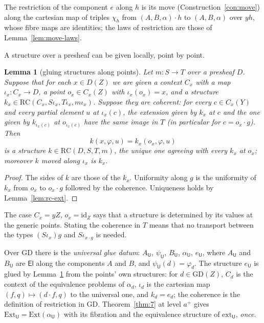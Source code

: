 \documentclass[11pt]{article}
\newcommand{\U}{\mathsf{U}}
\newcommand{\El}{\mathsf{El}}
\newcommand{\Ext}{\mathrm{Ext}}
\newcommand{\ext}{\mathrm{ext}}
\newcommand{\RC}{\mathrm{RC}}
\newcommand{\GD}{\mathrm{GD}}
\theoremstyle{plain}
\newtheorem{lemma}[theorem]{Lemma}
\theoremstyle{definition}
\theoremstyle{remark}
\begin{document}
The restriction of the component $e$ along $h$ is its move
(Construction~\ref{con:move}) along the cartesian map of triples
$\chi_h$ from $(A,B,\alpha)\cdot h$ to $(A,B,\alpha)$ over $yh$, whose
fibre maps are identities; the laws of restriction are those of
Lemma~\ref{lem:move-laws}.

A structure over a presheaf can be given locally, point by point.

\begin{lemma}[gluing structures along points]\label{lem:glue-rc}
Let $m:S\to T$ over a presheaf $D$. Suppose that for each $x\in D(Z)$
we are given a context $C_x$ with a map $\iota_x:C_x\to D$, a point
$o_x\in C_x(Z)$ with $\iota_x(o_x)=x$, and a structure
$k_x\in\RC(C_x,S\iota_x,T\iota_x,m\iota_x)$. Suppose they are
coherent: for every $c\in C_x(Y)$ and every partial element $u$ at
$\iota_x(c)$, the extension given by $k_x$ at $c$ and the one given by
$k_{\iota_x(c)}$ at $o_{\iota_x(c)}$ have the same image in $T$ (in
particular for $c=o_x\cdot g$). Then
\[
k(x,\varphi,u)=k_x(o_x,\varphi,u)
\]
is a structure $k\in\RC(D,S,T,m)$, the unique one agreeing with every
$k_x$ at $o_x$; moreover $k$ moved along $\iota_x$ is $k_x$.
\end{lemma}

\begin{proof}
The sides of $k$ are those of the $k_x$. Uniformity along $g$ is the
uniformity of $k_x$ from $o_x$ to $o_x\cdot g$ followed by the coherence.
Uniqueness holds by Lemma~\ref{lem:rc-ext}.
\end{proof}

The case $C_x=yZ$, $o_x=\mathrm{id}_Z$ says that a structure is
determined by its values at the generic points. Stating the coherence in
$T$ means that no transport between the types $(S\iota_x)g$ and
$S\iota_{x\cdot g}$ is needed.

Over $\GD$ there is the \emph{universal glue datum}: $A_\U$, $\psi_\U$,
$B_\U$, $\alpha_\U$, $e_\U$, where $A_\U$ and $B_\U$ are $\El$ along the
components $A$ and $B$, and $\psi_\U(d)=\varphi_d$. The structure $e_\U$
is glued by Lemma~\ref{lem:glue-rc} from the points' own structures:
for $d\in\GD(Z)$, $C_d$ is the context of the equivalence problems of
$\alpha_d$, $\iota_d$ is the cartesian map $(f,q)\mapsto(d\cdot f,q)$ to
the universal one, and $k_d=e_d$; the coherence is the definition of
restriction in $\GD$. Theorem~\ref{thm:7}
at level $a^+$ gives $\Ext_\U=\Ext(\alpha_\U)$ with its fibration and the
equivalence structure of $\ext_\U$, \emph{once}.
\end{document}
